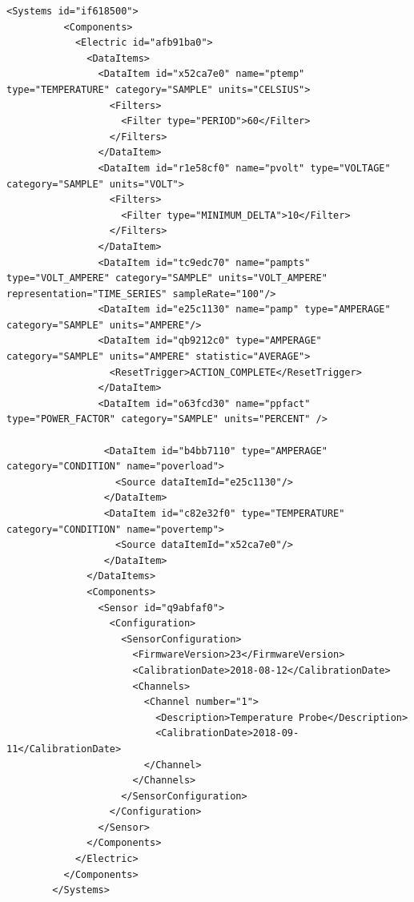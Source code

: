 \begin{lstlisting}[firstnumber=last,%
    caption={Electrical System and Sensor Configuration},label={lst:electric-system-example-1}]
        <Systems id="if618500">
          <Components>
            <Electric id="afb91ba0">
              <DataItems>
                <DataItem id="x52ca7e0" name="ptemp" type="TEMPERATURE" category="SAMPLE" units="CELSIUS">
                  <Filters>
                    <Filter type="PERIOD">60</Filter>
                  </Filters>
                </DataItem>
                <DataItem id="r1e58cf0" name="pvolt" type="VOLTAGE" category="SAMPLE" units="VOLT">
                  <Filters>
                    <Filter type="MINIMUM_DELTA">10</Filter>
                  </Filters>
                </DataItem>
                <DataItem id="tc9edc70" name="pampts" type="VOLT_AMPERE" category="SAMPLE" units="VOLT_AMPERE" representation="TIME_SERIES" sampleRate="100"/>
                <DataItem id="e25c1130" name="pamp" type="AMPERAGE" category="SAMPLE" units="AMPERE"/>
                <DataItem id="qb9212c0" type="AMPERAGE" category="SAMPLE" units="AMPERE" statistic="AVERAGE">
                  <ResetTrigger>ACTION_COMPLETE</ResetTrigger>
                </DataItem>
                <DataItem id="o63fcd30" name="ppfact" type="POWER_FACTOR" category="SAMPLE" units="PERCENT" />
                
                 <DataItem id="b4bb7110" type="AMPERAGE" category="CONDITION" name="poverload">
                   <Source dataItemId="e25c1130"/>
                 </DataItem>
                 <DataItem id="c82e32f0" type="TEMPERATURE" category="CONDITION" name="povertemp">
                   <Source dataItemId="x52ca7e0"/>
                 </DataItem>
              </DataItems>
              <Components>
                <Sensor id="q9abfaf0">
                  <Configuration>
                    <SensorConfiguration>
                      <FirmwareVersion>23</FirmwareVersion>
                      <CalibrationDate>2018-08-12</CalibrationDate>
                      <Channels>
                        <Channel number="1">
                          <Description>Temperature Probe</Description>
                          <CalibrationDate>2018-09-11</CalibrationDate>
                        </Channel>
                      </Channels>
                    </SensorConfiguration>
                  </Configuration>
                </Sensor>              
              </Components>
            </Electric>
          </Components>
        </Systems>
\end{lstlisting}

